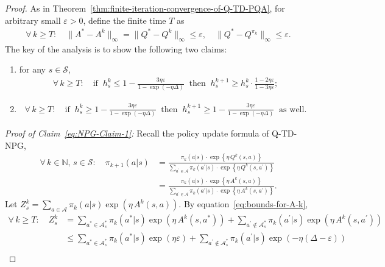 \documentclass[10pt]{article}
\newcommand{\calA}{\mathcal{A}}
\newcommand{\calS}{\mathcal{S}}
\newcommand{\ls}{\left}
\newcommand{\rs}{\right}
\theoremstyle{plain}
\theoremstyle{definition}
\begin{document}
\begin{proof}
    As in Theorem~\ref{thm:finite-iteration-convergence-of-Q-TD-PQA}, for arbitrary small $\varepsilon > 0$,  define the finite time $T$ as
    \begin{align*}
        \forall\, k\geq T: \quad \| A^* - A^k \|_\infty = \| Q^* - Q^k \|_\infty \leq \varepsilon, \quad \| Q^* - Q^{\pi_k} \|_\infty \leq \varepsilon.
    \end{align*}
    The key of the analysis is to show  the following two claims:
    \begin{enumerate}[label=(\Roman*)]
        \item \label{eq:NPG-Claim-1} for any $s\in\calS$, 
        \begin{align}
            \forall\, k\geq T: \quad \mbox{if} \;\; h_s^{k} \leq 1 - \frac{3\eta \varepsilon}{1-\exp(-\eta\Delta)} \;\; \mbox{then} \;\; h^{k+1}_s \geq h_s^k \cdot \frac{1-2\eta\varepsilon}{1-3\eta\varepsilon};
            \label{eq:NPG-property-1}
        \end{align}
        \item \label{eq:NPG-Claim-2} 
        \begin{align}
            \forall\, k \geq T: \quad \mbox{if} \;\; h_s^k \geq 1 - \frac{3\eta\varepsilon}{1-\exp(-\eta\Delta)} \;\; \mbox{then} \;\; h_s^{k+1} \geq 1 - \frac{3\eta\varepsilon}{1-\exp(-\eta\Delta)} \;\; \mbox{as well}.
        \end{align}
    \end{enumerate}
    \textit{Proof of Claim~\ref{eq:NPG-Claim-1}:} Recall the policy update formula of Q-TD-NPG,
    \begin{align*}
        \forall\, k\in\mathbb{N}, \, s\in\calS: \quad \pi_{k+1}(a|s) &= \frac{\pi_k(a|s) \cdot \exp \ls\{ \eta\, Q^k(s,a) \rs\}}{\sum_{a^\prime\in\calA} \pi_k(a^\prime|s) \cdot \exp \ls\{ \eta\, Q^k(s,a^\prime) \rs\}} \\
        &= \frac{\pi_k(a|s) \cdot \exp \ls\{ \eta\, A^k(s,a) \rs\}}{\sum_{a^\prime\in\calA} \pi_k(a^\prime|s) \cdot \exp \ls\{ \eta\, A^k(s,a^\prime) \rs\}}.
    \end{align*}
    Let $Z^k_s = \sum_{a\in\calA} \pi_k(a|s) \exp (\eta \, A^k(s,a))$. By equation~\eqref{eq:bounds-for-A-k}, 
    \begin{align*}
        \forall\, k \geq T: \quad Z_s^k &= \sum_{a^* \in\calA^*_s} \pi_k(a^*|s) \exp (\eta\, A^k(s,a^*)) + \sum_{a^\prime\not\in\calA^*_s} \pi_k(a^\prime|s) \exp (\eta\, A^k(s,a^\prime)) \\
        &\leq \sum_{a^*\in\calA^*_s} \pi_k(a^*|s) \exp(\eta \varepsilon) + \sum_{a^\prime\not\in\calA^*_s} \pi_k(a^\prime|s) \exp (-\eta (\Delta - \varepsilon)) \\

\end{align*}
\end{proof}
\end{document}

